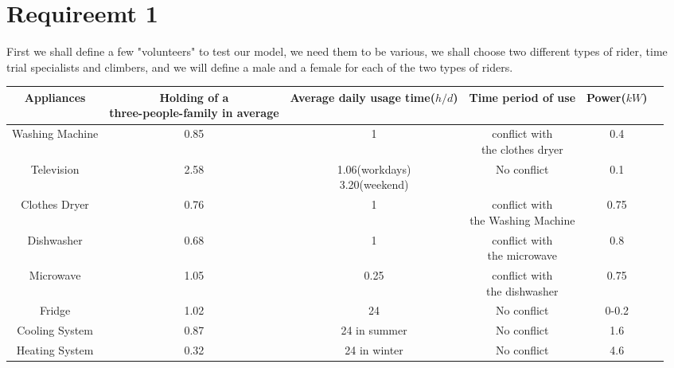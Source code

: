 \documentclass[12pt]{article}
\begin{document}
\section{Requireemt 1}
First we shall define a few "volunteers" to test our model, we need them to be various, we shall choose two different types of rider, time trial
specialists and climbers, and we will define a male and a female for each of the two types of riders.
\normalsize
\begin{center}
    \begin{tabular}{|c | c |c | c |c  |c|}
        \hline
        \bf Appliances  & \makecell {\bf Holding of a                                                              \\ \bf three-people-family in average} & \makecell{\bf Average daily\\ \bf usage time($h/d$)}  & \bf Time period of use
                        & \bf Power($kW$)                                                                          \\ \hline
        Washing Machine & 0.85                        & 1                        & \makecell{conflict with         \\the clothes dryer} & 0.4 \\ \hline
        Television      & 2.58                        & \makecell{1.06(workdays)                                   \\3.20(weekend)} & No conflict & 0.1 \\ \hline
        Clothes Dryer   & 0.76                        & 1                        & \makecell{conflict with         \\the Washing Machine}& 0.75 \\ \hline
        Dishwasher      & 0.68                        & 1                        & \makecell{conflict with         \\ the microwave}& 0.8\\ \hline
        Microwave       & 1.05                        & 0.25                     & \makecell{conflict with         \\ the dishwasher } & 0.75 \\\hline
        Fridge          & 1.02                        & 24                       & No conflict             & 0-0.2 \\ \hline
        Cooling System  & 0.87                        & 24 in summer             & No conflict             & 1.6   \\ \hline
        Heating System  & 0.32                        & 24 in winter             & No conflict             & 4.6   \\ \hline

\end{tabular}
\end{center}
\end{document}
